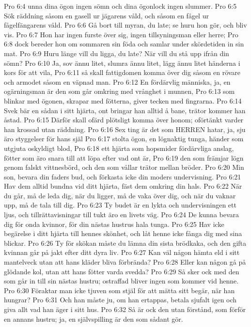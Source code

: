 Pro 6:4  unna dina ögon ingen sömn och dina ögonlock ingen slummer.
Pro 6:5  Sök räddning såsom en gasell ur jägarens våld, och såsom en fågel ur fågelfängarens våld.
Pro 6:6  Gå bort till myran, du late; se huru hon gör, och bliv vis.
Pro 6:7  Hon har ingen furste över sig, ingen tillsyningsman eller herre;
Pro 6:8  dock bereder hon om sommaren sin föda och samlar under skördetiden in sin mat.
Pro 6:9  Huru länge vill du ligga, du late? När vill du stå upp ifrån din sömn?
Pro 6:10  Ja, sov ännu litet, slumra ännu litet, lägg ännu litet händerna i kors för att vila,
Pro 6:11  så skall fattigdomen komma över dig såsom en rövare och armodet såsom en väpnad man.
Pro 6:12  En fördärvlig människa, ja, en ogärningsman är den som går omkring med vrånghet i munnen,
Pro 6:13  som blinkar med ögonen, skrapar med fötterna, giver tecken med fingrarna.
Pro 6:14  Svek bär en sådan i sitt hjärta, ont bringar han alltid å bane, trätor kommer han åstad.
Pro 6:15  Därför skall ofärd plötsligt komma över honom; oförtänkt varder han krossad utan räddning.
Pro 6:16  Sex ting är det som HERREN hatar, ja, sju äro styggelser för hans själ
Pro 6:17  stolta ögon, en lögnaktig tunga, händer som utgjuta oskyldigt blod,
Pro 6:18  ett hjärta som hopsmider fördärvliga anslag, fötter som äro snara till att löpa efter vad ont är,
Pro 6:19  den som främjar lögn genom falskt vittnesbörd, och den som vållar trätor mellan bröder.
Pro 6:20  Min son, bevara din faders bud, och förkasta icke din moders undervisning.
Pro 6:21  Hav dem alltid bundna vid ditt hjärta, fäst dem omkring din hals.
Pro 6:22  När du går, må de leda dig, när du ligger, må de vaka över dig, och när du vaknar upp, må de tala till dig.
Pro 6:23  Ty budet är en lykta och undervisningen ett ljus, och tillrättavisningar till tukt äro en livets väg.
Pro 6:24  De kunna bevara dig för onda kvinnor, för din nästas hustrus hala tunga.
Pro 6:25  Hav icke begärelse i ditt hjärta till hennes skönhet, och låt henne icke fånga dig med sina blickar.
Pro 6:26  Ty för skökan måste du lämna din sista brödkaka, och den gifta kvinnan går på jakt efter ditt dyra liv.
Pro 6:27  Kan väl någon hämta eld i sitt mantelveck utan att hans kläder bliva förbrända?
Pro 6:28  Eller kan någon gå på glödande kol, utan att hans fötter varda svedda?
Pro 6:29  Så sker ock med den som går in till sin nästas hustru; ostraffad bliver ingen som kommer vid henne.
Pro 6:30  Föraktar man icke tjuven som stjäl för att mätta sitt begär, när han hungrar?
Pro 6:31  Och han måste ju, om han ertappas, betala sjufalt igen och giva allt vad han äger i sitt hus.
Pro 6:32  Så är ock den utan förstånd, som förför en annans hustru; ja, en självspilling är den som sådant gör.
